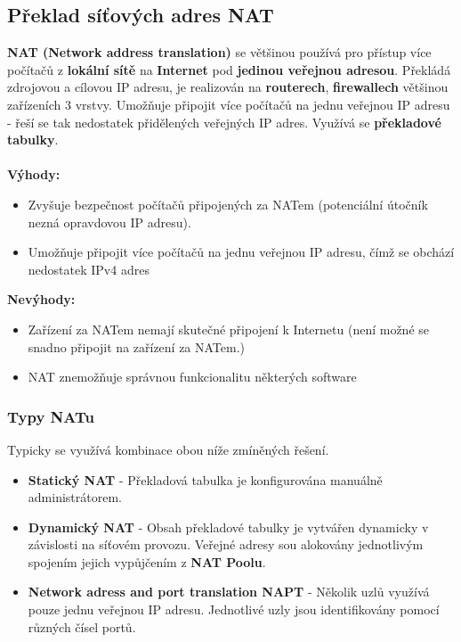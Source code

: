 \subsection{Překlad síťových adres NAT}
\textbf{NAT (Network address translation)} se většinou používá pro přístup více počítačů z \textbf{lokální sítě} na \textbf{Internet} pod \textbf{jedinou veřejnou adresou}. Překládá zdrojovou a cílovou IP adresu, je realizován na \textbf{routerech}, \textbf{firewallech} většinou zařízeních 3 vrstvy. Umožňuje připojit více počítačů na jednu veřejnou IP adresu - řeší se tak nedostatek přidělených veřejných IP adres. Využívá se \textbf{překladové tabulky}. 
\\\\
\textbf{Výhody:} 
\begin{itemize}
	\item Zvyšuje bezpečnost počítačů připojených za NATem (potenciální útočník nezná opravdovou IP adresu). 
	\item Umožňuje připojit více počítačů na jednu veřejnou IP adresu, čímž se obchází nedostatek IPv4 adres
\end{itemize}
\textbf{Nevýhody:}
\begin{itemize}
	\item Zařízení za NATem nemají skutečné připojení k Internetu (není možné se snadno připojit na zařízení za NATem.)
	\item NAT znemožňuje správnou funkcionalitu některých software
\end{itemize}

\subsubsection{Typy NATu}
Typicky se využívá kombinace obou níže zmíněných řešení.
\begin{itemize}
	\item \textbf{Statický NAT} - Překladová tabulka je konfigurována manuálně administrátorem.
	\item \textbf{Dynamický NAT} - Obsah překladové tabulky je vytvářen dynamicky v závislosti na síťovém provozu. Veřejné adresy sou alokovány jednotlivým spojením jejich vypůjčením z \textbf{NAT Poolu}.
	\item \textbf{Network adress and port translation NAPT} - Několik uzlů využívá pouze jednu veřejnou IP adresu. Jednotlivé uzly jsou identifikovány pomocí různých čísel portů.
\end{itemize}

